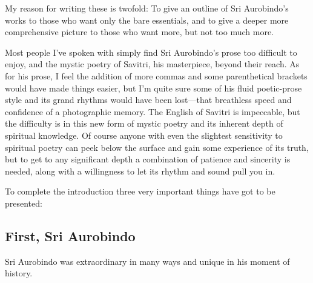 \documentclass[12pt,a4paper]{book}
\begin{document}
My reason for writing these is twofold: To give an outline of Sri
Aurobindo's works to those who want only the bare essentials, and to
give a deeper more comprehensive picture to those who want more, but
not too much more.

Most people I've spoken with simply find Sri Aurobindo's prose too
difficult to enjoy, and the mystic poetry of Savitri, his masterpiece,
beyond their reach. As for his prose, I feel the addition of more
commas and some parenthetical brackets would have made things easier,
but I'm quite sure some of his fluid poetic-prose style and its grand
rhythms would have been lost---that breathless speed and confidence of
a photographic memory. The English of Savitri is impeccable, but the
difficulty is in this new form of mystic poetry and its inherent depth
of spiritual knowledge. Of course anyone with even the slightest
sensitivity to spiritual poetry can peek below the surface and gain
some experience of its truth, but to get to any significant depth a
combination of patience and sincerity is needed, along with a
willingness to let its rhythm and sound pull you in.

To complete the introduction three very important things have got to
be presented:

\subsection*{First, Sri Aurobindo}

Sri Aurobindo was extraordinary in many ways and unique in his moment
of history.
\end{document}
